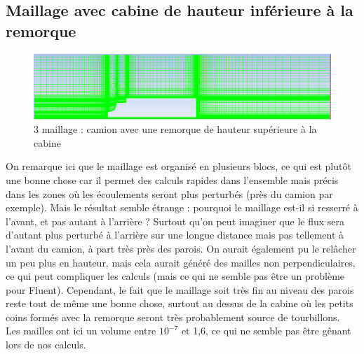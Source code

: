 \subsection{Maillage avec cabine de hauteur inférieure à la remorque}
\begin{figure}[!h]
\centering
\includegraphics[scale=0.38]{images/camion_remorque_1.png}
\caption{3\ieme{} maillage : camion avec une remorque de hauteur supérieure à la cabine}
\end{figure}
On remarque ici que le maillage est organisé en plusieurs blocs, ce qui est plutôt une bonne chose car il permet des calculs rapides dans l'ensemble mais précis dans les zones où les écoulements seront plus perturbés (près du camion par exemple). Mais le résultat semble étrange : pourquoi le maillage est-il si resserré à l'avant, et pas autant à l'arrière ? Surtout qu'on peut imaginer que le flux sera d'autant plus perturbé à l'arrière sur une longue distance mais pas tellement à l'avant du camion, à part très près des parois. On aurait également pu le relâcher un peu plus en hauteur, mais cela aurait généré des mailles non perpendiculaires, ce qui peut compliquer les calculs (mais ce qui ne semble pas être un problème pour Fluent). Cependant, le fait que le maillage soit très fin au niveau des parois reste tout de même une bonne chose, surtout au dessus de la cabine où les petits coins formés avec la remorque seront très probablement source de tourbillons. \\
Les mailles ont ici un volume entre $10^{-7}$ et 1,6, ce qui ne semble pas être gênant lors de nos calculs.

